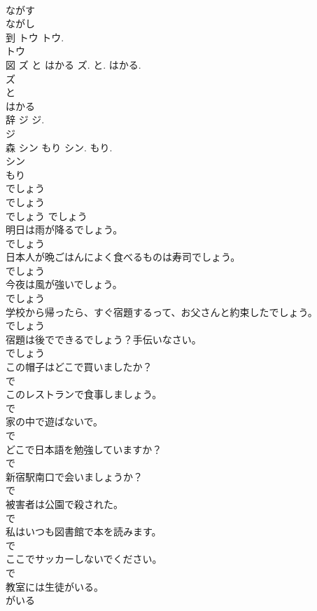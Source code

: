 \documentclass[8pt]{extreport}
\begin{document}
\begin{CJK}{UTF8}{min}
\\	ながす
\\	ながし
\\	到	トウ	トウ.	
\\	トウ
\\	図	ズ と はかる	ズ. と. はかる.	
\\	ズ
\\	と
\\	はかる
\\	辞	ジ	ジ.	
\\	ジ
\\	森	シン もり	シン. もり.	
\\	シン
\\	もり
\\	でしょう	
\\	でしょう	
\\	でしょう	でしょう
\\	明日は雨が降るでしょう。	
\\	でしょう
\\	日本人が晩ごはんによく食べるものは寿司でしょう。	
\\	でしょう
\\	今夜は風が強いでしょう。	
\\	でしょう
\\	学校から帰ったら、すぐ宿題するって、お父さんと約束したでしょう。	
\\	でしょう
\\	宿題は後でできるでしょう？手伝いなさい。	
\\	でしょう
\\	この帽子はどこで買いましたか？	
\\	で
\\	このレストランで食事しましょう。	
\\	で
\\	家の中で遊ばないで。	
\\	で
\\	どこで日本語を勉強していますか？	
\\	で
\\	新宿駅南口で会いましょうか？	
\\	で
\\	被害者は公園で殺された。	
\\	で
\\	私はいつも図書館で本を読みます。	
\\	で
\\	ここでサッカーしないでください。	
\\	で
\\	教室には生徒がいる。	
\\	がいる

\end{CJK}
\end{document}
